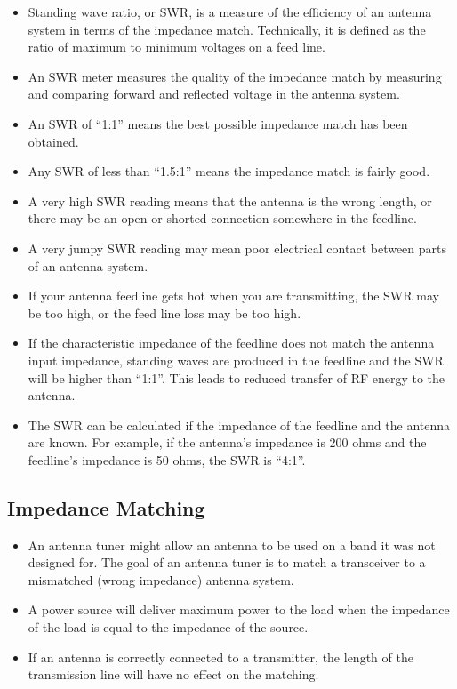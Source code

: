 \documentclass[letterpaper,12pt]{article}
\begin{document}
\begin{itemize}
\item Standing wave ratio, or SWR, is a measure of the efficiency of an antenna system in terms of the impedance match.
Technically, it is defined as the ratio of maximum to minimum voltages on a feed line.
\item An SWR meter measures the quality of the impedance match by measuring and comparing forward and reflected voltage in the antenna system.
\item An SWR of ``1:1'' means the best possible impedance match has been obtained.
\item Any SWR of less than ``1.5:1'' means the impedance match is fairly good.
\item A very high SWR reading means that the antenna is the wrong length, or there may be an open or shorted connection
somewhere in the feedline.
\item A very jumpy SWR reading may mean poor electrical contact between parts of an antenna system.
\item If your antenna feedline gets hot when you are transmitting, the SWR may be too high, or the feed line loss may be too high.
\item If the characteristic impedance of the feedline does not match the antenna input impedance, standing waves are produced in the feedline
and the SWR will be higher than ``1:1''. This leads to reduced transfer of RF energy to the antenna.
\item The SWR can be calculated if the impedance of the feedline and the antenna are known. For example, if the antenna's impedance is 200 ohms
and the feedline's impedance is 50 ohms, the SWR is ``4:1''.
\end{itemize}

\subsection{Impedance Matching}

\begin{itemize}
\item An antenna tuner might allow an antenna to be used on a band it was not designed for. 
The goal of an antenna tuner is to match a transceiver to a mismatched (wrong impedance) antenna system.
\item A power source will deliver maximum power to the load when the impedance of the load is equal
to the impedance of the source.
\item If an antenna is correctly connected to a transmitter, the length of the transmission line will have no effect on the matching.
\end{itemize}
\end{document}
